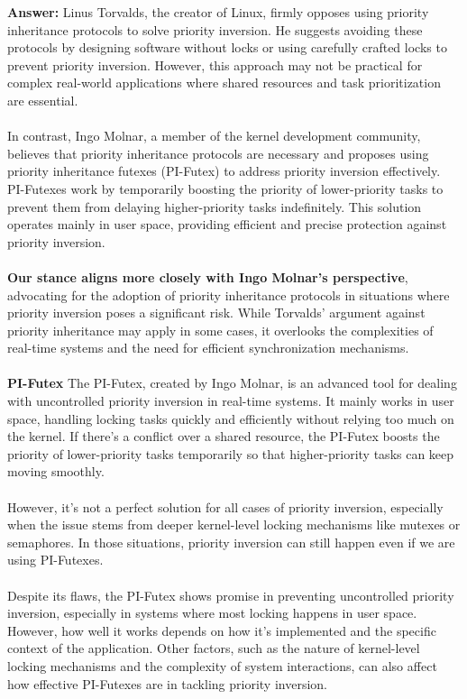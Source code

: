\documentclass[a4paper,11pt]{article}%
\newenvironment{qanda}{\setlength{\parindent}{0pt}}{\bigskip}
\newcommand{\A}{\par\textbf{Answer: } \normalfont}
\begin{document}
\begin{qanda}
\begin{enumerate}
\begin{enumerate}
				      \A Linus Torvalds, the creator of Linux, firmly opposes using priority inheritance protocols to solve priority inversion. He suggests avoiding these protocols by designing software without locks or using carefully crafted locks to prevent priority inversion. However, this approach may not be practical for complex real-world applications where shared resources and task prioritization are essential.\\\\
				      In contrast, Ingo Molnar, a member of the kernel development community, believes that priority inheritance protocols are necessary and proposes using priority inheritance futexes (PI-Futex) to address priority inversion effectively. PI-Futexes work by temporarily boosting the priority of lower-priority tasks to prevent them from delaying higher-priority tasks indefinitely. This solution operates mainly in user space, providing efficient and precise protection against priority inversion.\\\\
				      \textbf{Our stance aligns more closely with Ingo Molnar's perspective}, advocating for the adoption of priority inheritance protocols in situations where priority inversion poses a significant risk. While Torvalds' argument against priority inheritance may apply in some cases, it overlooks the complexities of real-time systems and the need for efficient synchronization mechanisms.\\\\
				      \textbf{PI-Futex}
				      The PI-Futex, created by Ingo Molnar, is an advanced tool for dealing with uncontrolled priority inversion in real-time systems. It mainly works in user space, handling locking tasks quickly and efficiently without relying too much on the kernel. If there's a conflict over a shared resource, the PI-Futex boosts the priority of lower-priority tasks temporarily so that higher-priority tasks can keep moving smoothly.\\\\
				      However, it's not a perfect solution for all cases of priority inversion, especially when the issue stems from deeper kernel-level locking mechanisms like mutexes or semaphores. In those situations, priority inversion can still happen even if we are using PI-Futexes.\\\\
				      Despite its flaws, the PI-Futex shows promise in preventing uncontrolled priority inversion, especially in systems where most locking happens in user space. However, how well it works depends on how it's implemented and the specific context of the application. Other factors, such as the nature of kernel-level locking mechanisms and the complexity of system interactions, can also affect how effective PI-Futexes are in tackling priority inversion.



\end{enumerate}
\end{enumerate}
\end{qanda}
\end{document}
